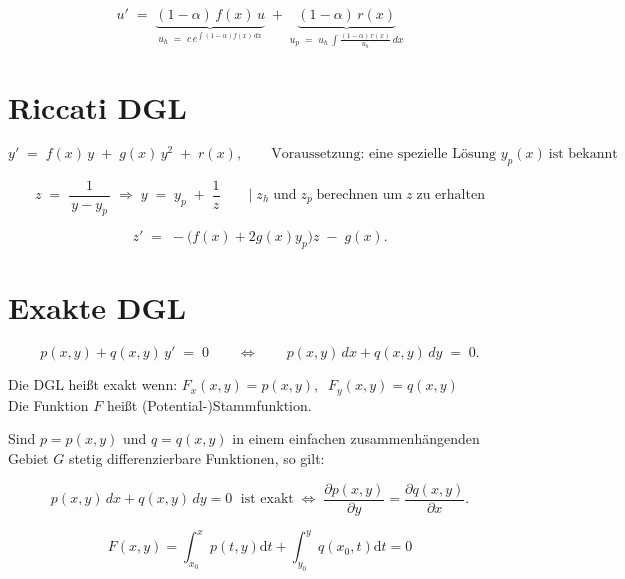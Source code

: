 \documentclass[a4paper,11pt,oneside,open=any,parskip=half, DIV=15]{scrreprt}
\begin{document}
      \begin{importantbox}
         \[
            u' \;=\;
            \underbrace{(1-\alpha)\,f(x)\,u}_{\displaystyle u_h \;=\; c\,e^{\int (1-\alpha)f(x)\,dx}}
            \;+\;
            \underbrace{(1-\alpha)\,r(x)}_{\displaystyle
            u_p \;=\; u_h \,\int \frac{(1-\alpha)\,r(x)}{\,u_h\,}\,dx}
         \]
      \end{importantbox}

\section{Riccati DGL}

   \begin{importantbox}
      \[
      y' \;=\; f(x)\,y \;+\; g(x)\,y^{2} \;+\; r(x),
      \qquad \text{Voraussetzung: eine spezielle Lösung } y_p(x)\ \text{ist bekannt}
      \]
   \end{importantbox}


   \[
      z \;=\; \frac{1}{\,y - y_p\,} \; \Rightarrow \; y \;=\; y_p \;+\; \frac{1}{z} \qquad \vert \; z_h \; \text{und} \;  z_p \; \text{berechnen um} \; z \; \text{zu erhalten}
   \]
   
   \[
      z' \;=\; -\bigl(f(x)+2g(x)y_p\bigr)z \;-\; g(x).
   \]


\section{Exakte DGL}

   \begin{importantbox}
      \[
         p(x,y)+q(x,y)\,y' \;=\; 0 \qquad\Longleftrightarrow\qquad p(x,y)\,dx + q(x,y)\,dy \;=\; 0.
      \]
   \end{importantbox}

   Die DGL heißt exakt wenn: \(F_x(x,y)=p(x,y),\;\;F_y(x,y)=q(x,y)\)\\
   Die Funktion \(F\) heißt (Potential-)Stammfunktion.

   Sind \(p = p(x,y)\) und \(q = q(x,y)\) in einem einfachen zusammenhängenden Gebiet \(G\) stetig differenzierbare Funktionen, so gilt:
   \begin{importantbox}
      \[
         p(x,y)\,dx+q(x,y)\,dy=0\;\text{ ist exakt}
         \;\Longleftrightarrow\;
         \frac{\partial p(x,y)}{\partial y}=\frac{\partial q(x,y)}{\partial x}.
      \]
   \end{importantbox}

   \begin{importantbox}
      \[
         F(x,y) = \int_{x_0}^{x} p(t,y) \mathrm{d}t + \int_{y_0}^{y} q(x_0,t) \mathrm{d}t = 0
      \]
   \end{importantbox}
\end{document}
